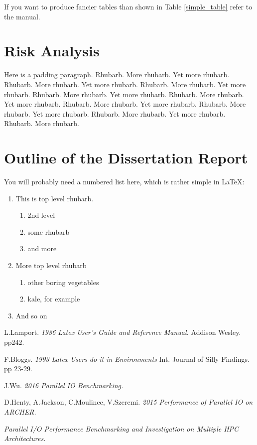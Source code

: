 \documentclass{article}
\begin{document}
If you want to produce fancier tables than shown in Table \ref{simple_table}
refer to the manual.



\section{Risk Analysis}

Here is a padding paragraph.  Rhubarb.  More rhubarb.  Yet more rhubarb. 
Rhubarb.  More rhubarb.  Yet more rhubarb.  Rhubarb.  More rhubarb.  Yet
more rhubarb.  Rhubarb.  More rhubarb.  Yet more rhubarb.  Rhubarb. 
More rhubarb.  Yet more rhubarb.  Rhubarb.  More rhubarb.  Yet more
rhubarb.  Rhubarb.  More rhubarb.  Yet more rhubarb.  Rhubarb.  More
rhubarb.  Yet more rhubarb.  Rhubarb.  More rhubarb.


\section{Outline of the Dissertation Report}

You will probably need a numbered list here, which is rather simple in \LaTeX:

\begin{enumerate}
	\item This is top level rhubarb.
	\begin{enumerate}
		\item 2nd level
		\item some rhubarb
		\item and more
	\end{enumerate}
	\item More top level rhubarb
	\begin{enumerate}
		\item other boring vegetables 
		\item kale, for example
	\end{enumerate}
	\item And so on
\end{enumerate}

\pagebreak
\begin{thebibliography}{100}

 L.Lamport. {\em 1986 Latex User's Guide
and Reference Manual.} Addison Wesley. pp242.

 F.Bloggs. {\em 1993 Latex Users do it
in Environments} Int. Journal of Silly Findings. pp 23-29.

 J.Wu. {\em 2016 Parallel IO Benchmarking.}

 D.Henty, A.Jackson, C.Moulinec, V.Szeremi. {\em 2015 Performance of Parallel IO on ARCHER.}

 {\em Parallel I/O Performance Benchmarking and Investigation on Multiple HPC Architectures.}

\end{thebibliography}
\end{document}
